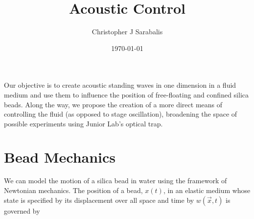 \usepackage{lgrind}        %
\usepackage{chapterbib}    %
\usepackage{color}         %
\usepackage{graphics}      %
\usepackage[pdftex]{graphicx}      %
\usepackage{longtable}     %
\usepackage{epsf}          %
\usepackage{bm}            %
\usepackage{thumbpdf}
\usepackage[colorlinks=true]{hyperref}  %




\title{Acoustic Control}
\author         {Christopher J Sarabalis}
\date{\today}


\begin{abstract}

\end{abstract}

\maketitle

Our objective is to create acoustic standing waves in one dimension in a fluid medium and use them to influence the position of free-floating and confined silica beads. Along the way, we propose the creation of a more direct means of controlling the fluid (as opposed to stage oscillation), broadening the space of possible experiments using Junior Lab's optical trap.

\section{Bead Mechanics}

We can model the motion of a silica bead in water using the framework of Newtonian mechanics.  The position of a bead, $x\left(t\right)$, in an elastic medium whose state is specified by its displacement over all space and time by $w\left(\vec{x},t\right)$ is governed by

